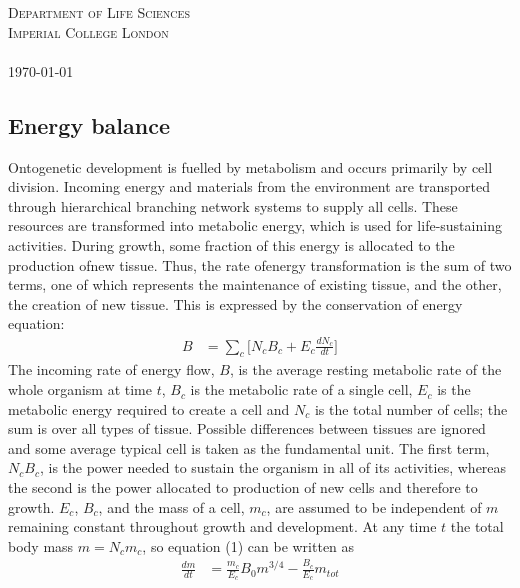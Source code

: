 \documentclass[a3paper]{article} %
\begin{document}
\begin{titlepage}
    \textsc{Department of Life Sciences \\ Imperial College London \\ \ }\\[1cm]
    \textsc{\today}\\[2cm] %
    
    \vfill %
    
\end{titlepage}

\begin{multicols}{2}
\begingroup
\Large
\section{Energy balance}
Ontogenetic development is fuelled by metabolism and occurs primarily by cell division. Incoming energy and materials from the environment are transported through hierarchical branching network systems to supply all cells. These resources are transformed into metabolic energy, which is used for life-sustaining activities. During growth, some fraction of this energy is allocated to the production ofnew tissue. Thus, the rate ofenergy transformation is the sum of two terms, one of which represents the maintenance of existing tissue, and the other, the creation of new tissue. This is expressed by the conservation of energy equation:
\begin{align}
    B &= \sum_c \Bigg[N_{c}B_{c} + E_{c}\frac{dN_{c}}{dt}\Bigg]
\end{align}
The incoming rate of energy flow, $B$, is the average resting metabolic rate of the whole organism at time $t$, $B_c$ is the metabolic rate of a single cell, $E_c$ is the metabolic energy required to create a cell and $N_c$ is the total number of cells; the sum is over all types of tissue. Possible differences between tissues are ignored and some average typical cell is taken as the fundamental unit. The first term, $N_{c}B_{c}$, is the power needed to sustain the organism in all of its activities, whereas the second is the power allocated to production of new cells and therefore to growth. $E_c$, $B_c$, and the mass of a cell, $m_c$, are assumed to be independent of $m$ remaining constant throughout growth and development. At any time $t$ the total body mass $m = N_{c}m_{c}$, so equation (1) can be written as
\begin{align}
    \frac{dm}{dt} &= \frac{m_c}{E_c}B_{0}m^{3/4} - \frac{B_{c}}{E_c}m_{tot}
\end{align}

\end{multicols}
\end{document}
